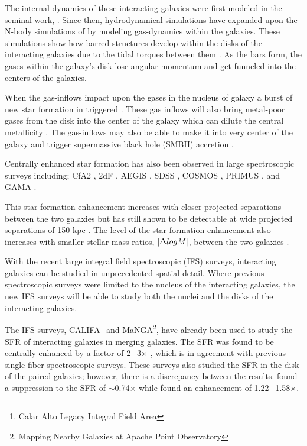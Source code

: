 \documentclass[iop,revtex4,twocolumn,apj,numberedappendix,appendixfloats]{emulateapj}
\begin{document}
The internal dynamics of these interacting galaxies were first modeled in the seminal work, \citet{Toomre:1972}. Since then, hydrodynamical simulations have expanded upon the N-body simulations of \citet{Toomre:1972} by modeling gas-dynamics within the galaxies. These simulations show how barred structures develop within the disks of the interacting galaxies due to the tidal torques between them \citep{Barnes:1991}. As the bars form, the gases within the galaxy's disk lose angular momentum and get funneled into the centers of the galaxies. 

When the gas-inflows impact upon the gases in the nucleus of galaxy a burst of new star formation in triggered \citep{Barnes:1996, Mihos:1996}. These gas inflows will also bring metal-poor gases from the disk into the center of the galaxy which can dilute the central metallicity \citep{Rupke:2010, Perez:2011, Scudder:2012}. The gas-inflows may also be able to make it into very center of the galaxy and trigger supermassive black hole (SMBH) accretion \citep{Capelo:2017}. 

Centrally enhanced star formation has also been observed in large spectroscopic surveys including; CfA2  \citep{Barton:2000, Woods:2006}, 2dF \citep{Lambas:2003}, AEGIS \citep{Lin:2007}, SDSS \citep{Ellison:2008}, COSMOS \citep{Kartaltepe:2007,Xu:2012}, PRIMUS \citep{Wong:2011}, and GAMA \citep{Robotham:2014}.

This star formation enhancement increases with closer projected separations between the two galaxies \citep{Ellison:2008, Scudder:2012} but has still shown to be detectable at wide projected separations of 150 kpc \citep{Patton:2013}. The level of the star formation enhancement also increases with smaller stellar mass ratios, $|\Delta log {\it M} |$, between the two galaxies \citep{Ellison:2008}. 

With the recent large integral field spectroscopic (IFS) surveys, interacting galaxies can be studied in unprecedented spatial detail. Where previous spectroscopic surveys were limited to the nucleus of the interacting galaxies, the new IFS surveys will be able to study both the nuclei and the disks of the interacting galaxies. 

The IFS surveys, CALIFA\footnote{Calar Alto Legacy Integral Field Area} and MaNGA\footnote{Mapping Nearby Galaxies at Apache Point Observatory}, have already been used to study the SFR of interacting galaxies in merging galaxies. The SFR was found to be centrally enhanced by a factor of 2$-$3$\times$ \citep{Barrera-Ballesteros:2015, Pan:2019}, which is in agreement with previous single-fiber spectroscopic surveys. These surveys also studied the SFR in the disk of the paired galaxies; however, there is a discrepancy between the results. \citet{Barrera-Ballesteros:2015} found a suppression to the SFR of $\sim$0.74$\times$ while \citet{Pan:2019} found an enhancement of 1.22$-$1.58$\times$. 
\end{document}
